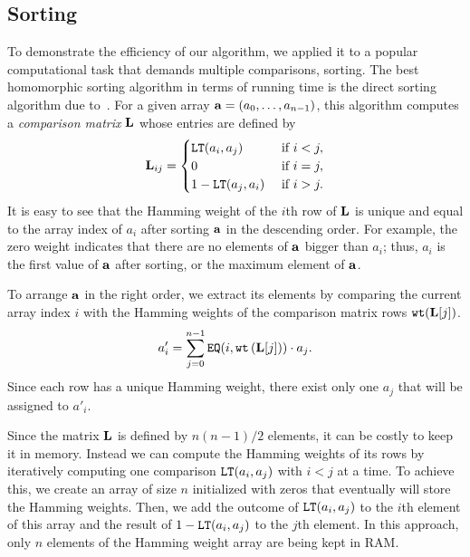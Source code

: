\subsection{Sorting}
\label{subsec:sorting}

        To demonstrate the efficiency of our algorithm, we applied it to a popular computational task that demands multiple comparisons, sorting.
	The best homomorphic sorting algorithm in terms of running time is the direct sorting algorithm due to~\cite{CDSS15}.
	For a given array $\mathbf{a} = (a_0,\dots,a_{n-1})$, this algorithm computes a \emph{comparison matrix} $\mathbf{L}$ whose entries are defined by
	\begin{align*}
		\mathbf{L}_{ij} =
		\begin{cases}
			\mathtt{LT}(a_i, a_j) & \text{ if } i < j, \\
			0 & \text{ if } i = j, \\
			1 - \mathtt{LT}(a_j, a_i) & \text{ if } i > j.
		\end{cases}
	\end{align*}
	It is easy to see that the Hamming weight of the $i$th row of $\mathbf{L}$ is unique and equal to the array index of $a_i$ after sorting $\mathbf{a}$ in the descending order.
	For example, the zero weight indicates that there are no elements of $\mathbf{a}$ bigger than $a_i$; thus, $a_i$ is the first value of $\mathbf{a}$ after sorting, or the maximum element of $\mathbf{a}$.

	To arrange $\mathbf{a}$ in the right order, we extract its elements by comparing the current array index $i$ with the Hamming weights of the comparison matrix rows $\texttt{wt}(\mathbf{L}[j])$.  
	\begin{align*}
		a'_i = \sum_{j=0}^{n-1} \mathtt{EQ}(i,\texttt{wt}\left(\mathbf{L}[j]\right)) \cdot a_j.
	\end{align*}
	Since each row has a unique Hamming weight, there exist only one $a_j$ that will be assigned to $a'_i$.

	\begin{remark}
		Since the matrix $\mathbf{L}$ is defined by $n(n-1)/2$ elements, it can be costly to keep it in memory.
		Instead we can compute the Hamming weights of its rows by iteratively computing one comparison $\mathtt{LT}(a_i, a_j)$ with $i < j$ at a time.
		To achieve this, we create an array of size $n$ initialized with zeros that eventually will store the Hamming weights.
		Then, we add the outcome of $\mathtt{LT}(a_i, a_j)$ to the $i$th element of this array and the result of $1-\mathtt{LT}(a_i, a_j)$ to the $j$th element.
		In this approach, only $n$ elements of the Hamming weight array are being kept in RAM.
	\end{remark}


